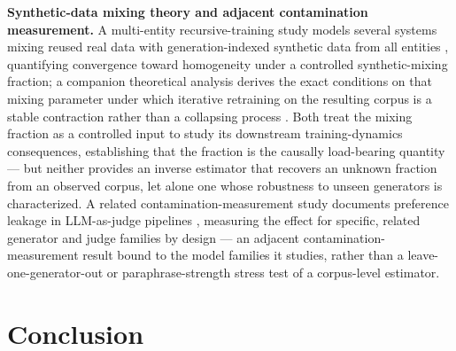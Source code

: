 \documentclass[11pt]{article}
\begin{document}
\textbf{Synthetic-data mixing theory and adjacent contamination measurement.} A multi-entity recursive-training study models several systems mixing reused real data with generation-indexed synthetic data from all entities \citep{RecursiveMultiEntity2024}, quantifying convergence toward homogeneity under a controlled synthetic-mixing fraction; a companion theoretical analysis derives the exact conditions on that mixing parameter under which iterative retraining on the resulting corpus is a stable contraction rather than a collapsing process \citep{IterativeRetrainStability2024}. Both treat the mixing fraction as a controlled input to study its downstream training-dynamics consequences, establishing that the fraction is the causally load-bearing quantity --- but neither provides an inverse estimator that recovers an unknown fraction from an observed corpus, let alone one whose robustness to unseen generators is characterized. A related contamination-measurement study documents preference leakage in LLM-as-judge pipelines \citep{PreferenceLeakage2024}, measuring the effect for specific, related generator and judge families by design --- an adjacent contamination-measurement result bound to the model families it studies, rather than a leave-one-generator-out or paraphrase-strength stress test of a corpus-level estimator.

\section{Conclusion}
\end{document}
